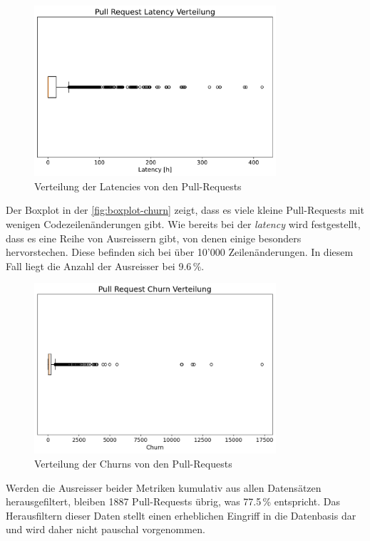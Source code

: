 \begin{figure}[htbp]
    \includegraphics[width=0.8\textwidth]{Figures/boxplot-latency.pdf}
    \centering
    \caption{Verteilung der Latencies von den Pull-Requests}
    \label{fig:boxplot-latency}
\end{figure}
 \newpage
Der Boxplot in der \autoref{fig:boxplot-churn} zeigt, dass es viele kleine Pull-Requests mit wenigen Codezeilenänderungen gibt. Wie bereits bei der \textit{latency} wird festgestellt, dass es eine Reihe von Ausreissern gibt, von denen einige besonders hervorstechen. Diese befinden sich bei über 10'000 Zeilenänderungen. In diesem Fall liegt die Anzahl der Ausreisser bei 9.6\,\%.

\begin{figure}[htbp]
    \includegraphics[width=0.8\textwidth]{Figures/boxplot-churn.png}
      \centering
    \caption{Verteilung der Churns von den Pull-Requests}
    \label{fig:boxplot-churn}
\end{figure}

Werden die Ausreisser beider Metriken kumulativ aus allen Datensätzen herausgefiltert, bleiben 1887 Pull-Requests übrig, was 77.5\,\% entspricht. Das Herausfiltern dieser Daten stellt einen erheblichen Eingriff in die Datenbasis dar und wird daher nicht pauschal vorgenommen.

